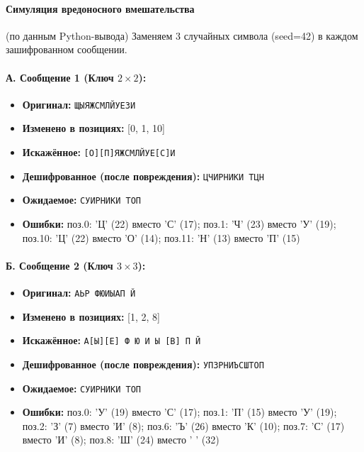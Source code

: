 \paragraph{Симуляция вредоносного вмешательства} (по данным Python-вывода)
Заменяем 3 случайных символа (seed=42) в каждом зашифрованном сообщении.

\paragraph{А. Сообщение 1 (Ключ $2\times2$):}
\begin{itemize}
    \item \textbf{Оригинал:} \texttt{ЩЫЯЖСМЛЙУЕЗИ}
    \item \textbf{Изменено в позициях:} [0, 1, 10]
    \item \textbf{Искажённое:} \texttt{[О][П]ЯЖСМЛЙУЕ[С]И}
    \item \textbf{Дешифрованное (после повреждения):} \texttt{ЦЧИРНИКИ ТЦН}
    \item \textbf{Ожидаемое:} \texttt{СУИРНИКИ ТОП}
    \item \textbf{Ошибки:} поз.0: 'Ц' (22) вместо 'С' (17); поз.1: 'Ч' (23) вместо 'У' (19); поз.10: 'Ц' (22) вместо 'О' (14); поз.11: 'Н' (13) вместо 'П' (15)
\end{itemize}

\paragraph{Б. Сообщение 2 (Ключ $3\times3$):}
\begin{itemize}
    \item \textbf{Оригинал:} \texttt{АЬР ФЮИЫАП Й}
    \item \textbf{Изменено в позициях:} [1, 2, 8]
    \item \textbf{Искажённое:} \texttt{А[Ы][Е]   Ф Ю И Ы [В] П   Й}
    \item \textbf{Дешифрованное (после повреждения):} \texttt{УПЗРНИЪСШТОП}
    \item \textbf{Ожидаемое:} \texttt{СУИРНИКИ ТОП}
    \item \textbf{Ошибки:} поз.0: 'У' (19) вместо 'С' (17); поз.1: 'П' (15) вместо 'У' (19); поз.2: 'З' (7) вместо 'И' (8); поз.6: 'Ъ' (26) вместо 'К' (10); поз.7: 'С' (17) вместо 'И' (8); поз.8: 'Ш' (24) вместо ' ' (32)
\end{itemize}


